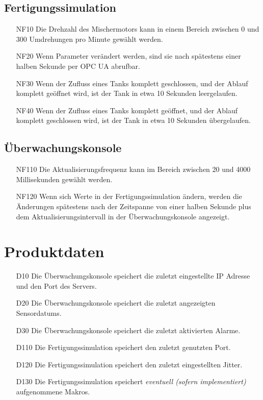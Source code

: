 \documentclass[parskip=full]{scrartcl}
\begin{document}
\subsection{Fertigungssimulation}
\begin{enumerate}
 \item[NF10] Die Drehzahl des Mischermotors kann in einem Bereich zwischen 0 und 300 Umdrehungen pro Minute gewählt werden.
 \item[NF20] Wenn Parameter verändert werden, sind sie nach spätestens einer halben Sekunde per OPC UA abrufbar.
 \item[NF30] Wenn der Zufluss eines Tanks komplett geschlossen, und der Ablauf komplett geöffnet wird, ist der Tank in etwa 10 Sekunden leergelaufen.
 \item[NF40] Wenn der Zufluss eines Tanks komplett geöffnet, und der Ablauf komplett geschlossen wird, ist der Tank in etwa 10 Sekunden übergelaufen.
\end{enumerate}

\subsection{Überwachungskonsole}
\begin{enumerate}
 \item[NF110] Die Aktualisierungsfrequenz kann im Bereich zwischen 20 und 4000 Millisekunden gewählt werden.
 \item[NF120] Wenn sich Werte in der Fertigungssimulation ändern, werden die Änderungen spätestens nach der Zeitspanne von
   einer halben Sekunde plus dem Aktualisierungsintervall in der Überwachungskonsole angezeigt.
\end{enumerate}

\section{Produktdaten}
\begin{enumerate}
 \item[D10] Die Überwachungskonsole speichert die zuletzt eingestellte IP Adresse und den Port des Servers.
 \item[D20] Die Überwachungskonsole speichert die zuletzt angezeigten \glspl{Sensordatum}.
 \item[D30] Die Überwachungskonsole speichert die zuletzt aktivierten Alarme.
 \item[D110] Die Fertigungssimulation speichert den zuletzt genutzten Port.
 \item[D120] Die Fertigungssimulation speichert den zuletzt eingestellten \gls{Jitter}.
 \item[D130] Die Fertigungssimulation speichert \emph{eventuell (sofern implementiert)} aufgenommene \glspl{Makro}.
\end{enumerate}
\end{document}
